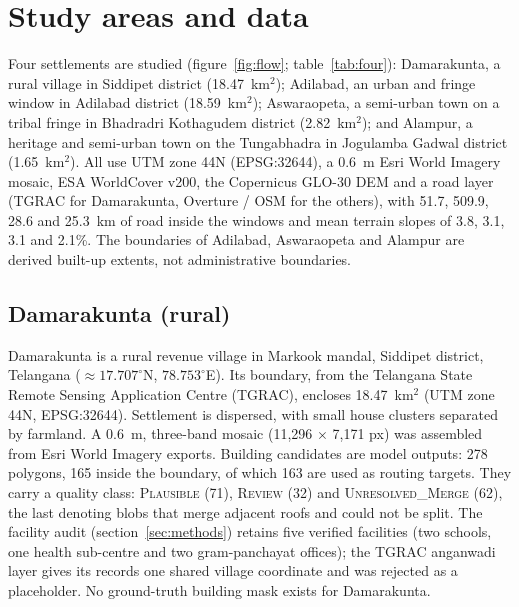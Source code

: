 \documentclass[12pt,a4paper]{article}
\begin{document}
\section{Study areas and data}
Four settlements are studied (figure~\ref{fig:flow}; table~\ref{tab:four}): Damarakunta, a rural village in Siddipet district (18.47~km$^2$); Adilabad, an urban and fringe window in Adilabad district (18.59~km$^2$); Aswaraopeta, a semi-urban town on a tribal fringe in Bhadradri Kothagudem district (2.82~km$^2$); and Alampur, a heritage and semi-urban town on the Tungabhadra in Jogulamba Gadwal district (1.65~km$^2$). All use UTM zone 44N (EPSG:32644), a 0.6~m Esri World Imagery mosaic, ESA WorldCover v200, the Copernicus GLO-30 DEM and a road layer (TGRAC for Damarakunta, Overture / OSM for the others), with 51.7, 509.9, 28.6 and 25.3~km of road inside the windows and mean terrain slopes of 3.8, 3.1, 3.1 and 2.1\%. The boundaries of Adilabad, Aswaraopeta and Alampur are derived built-up extents, not administrative boundaries.

\subsection{Damarakunta (rural)}
Damarakunta is a rural revenue village in Markook mandal, Siddipet district, Telangana ($\approx 17.707^{\circ}$N, $78.753^{\circ}$E). Its boundary, from the Telangana State Remote Sensing Application Centre (TGRAC), encloses 18.47~km$^2$ (UTM zone 44N, EPSG:32644). Settlement is dispersed, with small house clusters separated by farmland. A 0.6~m, three-band mosaic (11{,}296 $\times$ 7{,}171 px) was assembled from Esri World Imagery exports. Building candidates are model outputs: 278 polygons, 165 inside the boundary, of which 163 are used as routing targets. They carry a quality class: \textsc{Plausible} (71), \textsc{Review} (32) and \textsc{Unresolved\_Merge} (62), the last denoting blobs that merge adjacent roofs and could not be split. The facility audit (section~\ref{sec:methods}) retains five verified facilities (two schools, one health sub-centre and two gram-panchayat offices); the TGRAC anganwadi layer gives its records one shared village coordinate and was rejected as a placeholder. No ground-truth building mask exists for Damarakunta.
\end{document}

